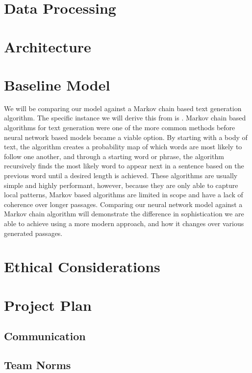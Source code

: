 \documentclass{article} %
\begin{document}
\section{Data Processing}


\section{Architecture}


\section{Baseline Model}

We will be comparing our model against a Markov chain based text generation algorithm. The specific instance we will derive this from is \cite{haikugeneration}.
Markov chain based algorithms for text generation were one of the more common methods before neural network based models became a viable option. By starting with a body of text, the algorithm creates a probability map of which words are most likely to follow one another, and through a starting word or phrase, the algorithm recursively finds the most likely word to appear next in a sentence based on the previous word until a desired length is achieved. These algorithms are usually simple and highly performant, however, because they are only able to capture local patterns, Markov based algorithms are limited in scope and have a lack of coherence over longer passages. Comparing our neural network model against a Markov chain algorithm will demonstrate the difference in sophistication we are able to achieve using a more modern approach, and how it changes over various generated passages.


\section{Ethical Considerations}


\section{Project Plan}
\label{project_plan}

\subsection{Communication}

\subsection{Team Norms}
\end{document}
